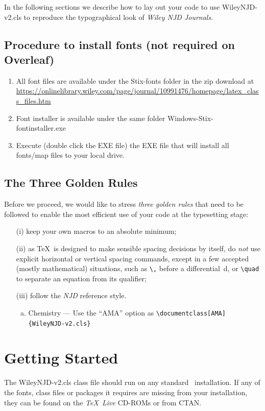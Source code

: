 \documentclass[AMA,STIX1COL]{WileyNJD-v2}
\begin{document}
In the following sections we describe how to lay out your code to
use \textsf{WileyNJD-v2.cls} to reproduce the typographical look of
\emph{Wiley NJD Journals}.

\subsection{Procedure to install fonts (not required on Overleaf)}
 
\begin{enumerate}
\item All font files are available under the Stix-fonts folder in the zip download at \url{https://onlinelibrary.wiley.com/page/journal/10991476/homepage/latex_class_files.htm}
\item Font installer is available under the same folder Windows-Stix-fontinstaller.exe
\item Execute (double click the EXE file) the EXE file that will install all fonts/map files to your local drive.
\end{enumerate}

\subsection{The Three Golden Rules} 

Before we proceed, we would like to
stress \emph{three golden rules} that need to be followed to
enable the most efficient use of your code at the typesetting
stage:
\begin{enumerate}
\item[(i)] keep your own macros to an absolute minimum;

\item[(ii)] as \TeX\ is designed to make sensible spacing
decisions by itself, do \emph{not} use explicit horizontal or
vertical spacing commands, except in a few accepted (mostly
mathematical) situations, such as \verb"\," before a
differential~d, or \verb"\quad" to separate an equation from its
qualifier;

\item[(iii)] follow the \emph{NJD} reference style.
\begin{enumerate}[a.]
\item Chemistry --- Use the ``AMA'' option as \verb"\documentclass[AMA]{WileyNJD-v2.cls}"

\end{enumerate}
\end{enumerate}


\section{Getting Started} The \textsf{WileyNJD-v2.cls} class file should run
on any standard \LaTeXe\ installation. If any of the fonts, class
files or packages it requires are missing from your installation,
they can be found on the \emph{\TeX\ Live} CD-ROMs or from CTAN.
\end{document}
